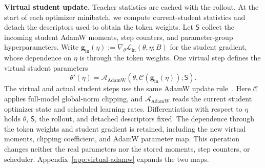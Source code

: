 \documentclass{article}
\theoremstyle{plain}
\theoremstyle{definition}
\theoremstyle{remark}
\begin{document}
\textbf{Virtual student update.}
Teacher statistics are cached with the rollout. At the start of each optimizer minibatch, we compute current-student statistics and detach the descriptors used to obtain the token weights. Let \(\mathsf S\) collect the incoming student AdamW moments, step counters, and parameter-group hyperparameters. Write \(\boldsymbol g_{\mathrm{in}}(\eta):=\nabla_\theta\mathcal L_{\mathrm{in}}(\theta,\eta;B)\) for the student gradient, whose dependence on \(\eta\) is through the token weights. One virtual step defines the virtual student parameters
\begin{equation}
    \theta'(\eta)=\mathcal A_{\mathrm{AdamW}}\!\left(
       \theta,\mathcal C\!\left(\boldsymbol g_{\mathrm{in}}(\eta)\right);\mathsf S\right).
    \label{eq:virtual-update}
\end{equation}
The virtual and actual student steps use the same AdamW update rule~\citep{loshchilov2017decoupled}. Here \(\mathcal C\) applies full-model global-norm clipping, and \(\mathcal A_{\mathrm{AdamW}}\) reads the current student optimizer state and scheduled learning rates. Differentiation with respect to \(\eta\) holds \(\theta\), \(\mathsf S\), the rollout, and detached descriptors fixed. The dependence through the token weights and student gradient is retained, including the new virtual moments, clipping coefficient, and AdamW parameter map. This operation changes neither the real parameters nor the stored moments, step counters, or scheduler. Appendix~\ref{app:virtual-adamw} expands the two maps.
\end{document}
